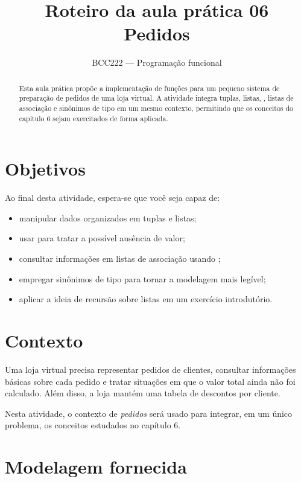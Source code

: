 \documentclass{article}
\title{Roteiro da aula prática 06\\Pedidos}
\author{BCC222 --- Programação funcional}
\date{}
\begin{document}
\maketitle

\begin{abstract}
Esta aula prática propõe a implementação de funções para um pequeno sistema
de preparação de pedidos de uma loja virtual. A atividade integra tuplas,
listas, , listas de associação e sinônimos de tipo em um
mesmo contexto, permitindo que os conceitos do capítulo 6 sejam exercitados
de forma aplicada.
\end{abstract}

\section{Objetivos}

Ao final desta atividade, espera-se que você seja capaz de:

\begin{itemize}
  \item manipular dados organizados em tuplas e listas;
  \item usar  para tratar a possível ausência de valor;
  \item consultar informações em listas de associação usando
  ;
  \item empregar sinônimos de tipo para tornar a modelagem mais legível;
  \item aplicar a ideia de recursão sobre listas em um exercício introdutório.
\end{itemize}

\section{Contexto}

Uma loja virtual precisa representar pedidos de clientes, consultar
informações básicas sobre cada pedido e tratar situações em que o valor total
ainda não foi calculado. Além disso, a loja mantém uma tabela de descontos
por cliente.

Nesta atividade, o contexto de \emph{pedidos} será usado para integrar, em um
único problema, os conceitos estudados no capítulo 6.

\section{Modelagem fornecida}
\end{document}
